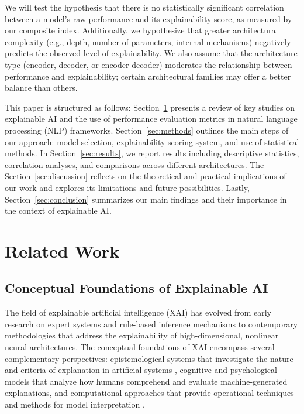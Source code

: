 \documentclass[preprint,12pt]{elsarticle}
\begin{document}
We will test the hypothesis that there is no statistically significant correlation between a model's raw performance and its explainability score, as measured by our composite index. Additionally, we hypothesize that greater architectural complexity (e.g., depth, number of parameters, internal mechanisms) negatively predicts the observed level of explainability. We also assume that the architecture type (encoder, decoder, or encoder-decoder) moderates the relationship between performance and explainability; certain architectural families may offer a better balance than others.

This paper is structured as follows: Section~\ref{sec:related_work} presents a review of key studies on explainable AI and the use of performance evaluation metrics in natural language processing (NLP) frameworks. Section~\ref{sec:methods} outlines the main steps of our approach: model selection, explainability scoring system, and use of statistical methods. In Section~\ref{sec:results}, we report results including descriptive statistics, correlation analyses, and comparisons across different architectures. The Section~\ref{sec:discussion} reflects on the theoretical and practical implications of our work and explores its limitations and future possibilities. Lastly, Section~\ref{sec:conclusion} summarizes our main findings and their importance in the context of explainable AI.


\section{Related Work}
\label{sec:related_work}

\subsection{Conceptual Foundations of Explainable AI}
The field of explainable artificial intelligence (XAI) has evolved from early research on expert systems and rule-based inference mechanisms to contemporary methodologies that address the explainability of high-dimensional, nonlinear neural architectures. The conceptual foundations of XAI encompass several complementary perspectives: epistemological systems that investigate the nature and criteria of explanation in artificial systems \cite{miller2019explanation}, cognitive and psychological models that analyze how humans comprehend and evaluate machine-generated explanations, and computational approaches that provide operational techniques and methods for model interpretation \cite{guidotti2018survey}.
\end{document}

